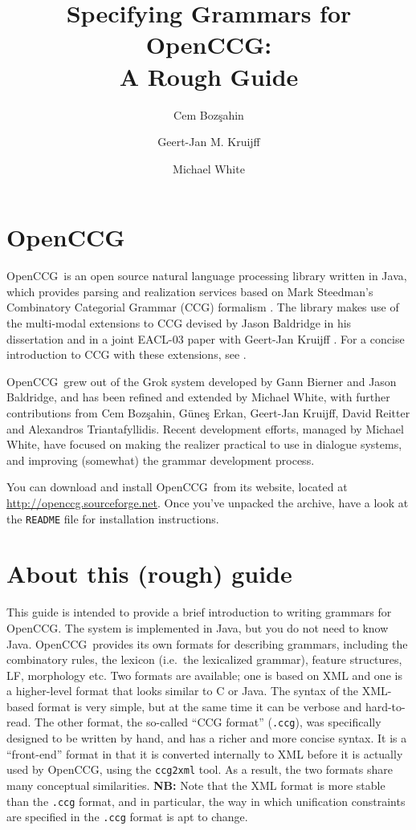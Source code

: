 \documentclass[11pt]{article}
\title{Specifying Grammars for OpenCCG: \\ A Rough Guide}
\author{Cem Boz\c{s}ahin \and Geert-Jan M. Kruijff \and Michael White}
\newcommand{\occg}{OpenCCG}
\begin{document}
\thispagestyle{empty}
\maketitle
\tableofcontents
\listoftables
\listoffigures
\newpage

\section{OpenCCG} 

\occg\ is an open source natural language processing library written in
Java, which provides parsing and realization services based on Mark
Steedman's Combinatory Categorial Grammar (CCG) formalism
\cite{Steedman:SynProc}. The library makes use of the multi-modal
extensions to CCG devised by Jason Baldridge in his dissertation
\cite{Baldridge:2002} and in a joint EACL-03 paper with Geert-Jan
Kruijff \cite{Baldridge/Kruijff:2003}. For a concise introduction to CCG
with these extensions, see \cite{Steedman/Baldridge:2003}.

\occg\ grew out of the Grok system developed by Gann Bierner and Jason
Baldridge, and has been refined and extended by Michael White, with
further contributions from Cem Boz\c{s}ahin, G\"une\c{s} Erkan,
Geert-Jan Kruijff, David Reitter and Alexandros Triantafyllidis. Recent
development efforts, managed by Michael White, have focused on making
the realizer
\cite{White/Baldridge:2003,White-RLAC:2004,White-INLG:2004,White-ACLSoft:2005}
practical to use in dialogue systems, and improving (somewhat) the grammar
development process.

You can download and install \occg\ from its website, located at
\url{http://openccg.sourceforge.net}. Once you've unpacked the archive,
have a look at the \texttt{README} file for installation
instructions.


\section{About this (rough) guide}

This guide is intended to provide a brief introduction to writing grammars for
\occg. The system is implemented in Java, but you do not need to know Java.
\occg\ provides its own formats for describing grammars, including the
combinatory rules, the lexicon (i.e.\ the lexicalized grammar), feature
structures, LF, morphology etc. Two formats are available; one is based on XML
and one is a higher-level format that looks similar to C or Java. The syntax of
the XML-based format is very simple, but at the same time it can be verbose and
hard-to-read. The other format, the so-called ``CCG format'' (\texttt{.ccg}),
was specifically designed to be written by hand, and has a richer and more
concise syntax. It is a ``front-end'' format in that it is converted internally
to XML before it is actually used by \occg, using the \texttt{ccg2xml} tool. As
a result, the two formats share many conceptual similarities.
\textbf{NB:} Note that the XML format is more stable than the \texttt{.ccg} format, and in particular, the way in which unification constraints are 
specified in the \texttt{.ccg} format is apt to change.
\end{document}
